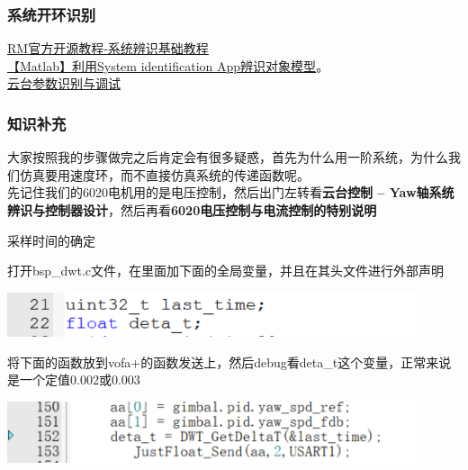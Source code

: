 \documentclass[UTF8,a4paper,12pt]{ctexart}
\begin{document}
    \subsubsection{系统开环识别}

    \href{https://bbs.robomaster.com/wiki/4574/3559}{RM官方开源教程-系统辨识基础教程}
    \\\href{ https://blog.csdn.net/xiaohejiaoyiya/article/details/105958551?ops_request_misc=%257B%2522request%255Fid%2522%253A%2522d515a96088d8f99093ec8d0b4cb80d62%2522%252C%2522scm%2522%253A%252220140713.130102334.pc%255Fall.%2522%257D&request_id=d515a96088d8f99093ec8d0b4cb80d62&biz_id=0&utm_medium=distribute.pc_search_result.none-task-blog-2~all~first_rank_ecpm_v1~rank_v31_ecpm-1-105958551-null-null.142^v100^pc_search_result_base1&utm_term=%E5%88%A9%E7%94%A8system%20identification%E7%A1%AE%E8%AE%A4%E6%A8%A1%E5%9E%8B&spm=1018.2226.3001.4187}{【Matlab】利用System identification App辨识对象模型}。\\
     \href{https://www.bilibili.com/video/BV1wX7BzVEf6/?spm_id_from=333.1391.0.0&vd_source=b02f21f21dd17ebeef8dac9338c9d06c}{云台参数识别与调试}    
    \subsubsection{知识补充}
    \begin{flushleft}
      大家按照我的步骤做完之后肯定会有很多疑惑，首先为什么用一阶系统，为什么我们仿真要用速度环，而不直接仿真系统的传递函数呢。
      \\先记住我们的6020电机用的是电压控制，然后出门左转看\textbf{云台控制 -- Yaw轴系统辨识与控制器设计}，然后再看\textbf{6020电压控制与电流控制的特别说明}
    \end{flushleft}
    \begin{titlebox}{采样时间的确定}
      \begin{flushleft}
         打开bsp\_dwt.c文件，在里面加下面的全局变量，并且在其头文件进行外部声明
      \end{flushleft}
      \par \includegraphics[width=12cm]{picture/variable.png}
      \\
      \begin{flushleft}
        将下面的函数放到vofa+的函数发送上，然后debug看deta\_t这个变量，正常来说是一个定值0.002或0.003
        \par \includegraphics[width=12cm]{picture/variable_1.png}
      \end{flushleft}
    \end{titlebox}
    
\end{document}
